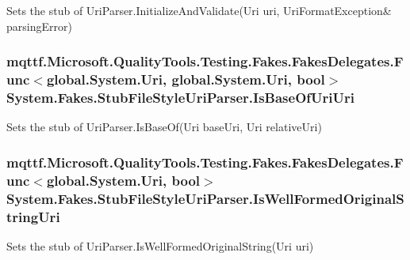 Sets the stub of Uri\-Parser.\-Initialize\-And\-Validate(Uri uri, Uri\-Format\-Exception\& parsing\-Error)

\hypertarget{class_system_1_1_fakes_1_1_stub_file_style_uri_parser_a94f0e45bb6dff3808831dc51d4c03393}{
\subsubsection[{Is\-Base\-Of\-Uri\-Uri}]{\setlength{\rightskip}{0pt plus 5cm}mqttf.\-Microsoft.\-Quality\-Tools.\-Testing.\-Fakes.\-Fakes\-Delegates.\-Func$<$global.\-System.\-Uri, global.\-System.\-Uri, bool$>$ System.\-Fakes.\-Stub\-File\-Style\-Uri\-Parser.\-Is\-Base\-Of\-Uri\-Uri}}\label{class_system_1_1_fakes_1_1_stub_file_style_uri_parser_a94f0e45bb6dff3808831dc51d4c03393}


Sets the stub of Uri\-Parser.\-Is\-Base\-Of(\-Uri base\-Uri, Uri relative\-Uri)

\hypertarget{class_system_1_1_fakes_1_1_stub_file_style_uri_parser_a4c480e858522406bcb58b2b440a0bb0d}{
\subsubsection[{Is\-Well\-Formed\-Original\-String\-Uri}]{\setlength{\rightskip}{0pt plus 5cm}mqttf.\-Microsoft.\-Quality\-Tools.\-Testing.\-Fakes.\-Fakes\-Delegates.\-Func$<$global.\-System.\-Uri, bool$>$ System.\-Fakes.\-Stub\-File\-Style\-Uri\-Parser.\-Is\-Well\-Formed\-Original\-String\-Uri}}\label{class_system_1_1_fakes_1_1_stub_file_style_uri_parser_a4c480e858522406bcb58b2b440a0bb0d}


Sets the stub of Uri\-Parser.\-Is\-Well\-Formed\-Original\-String(\-Uri uri)


